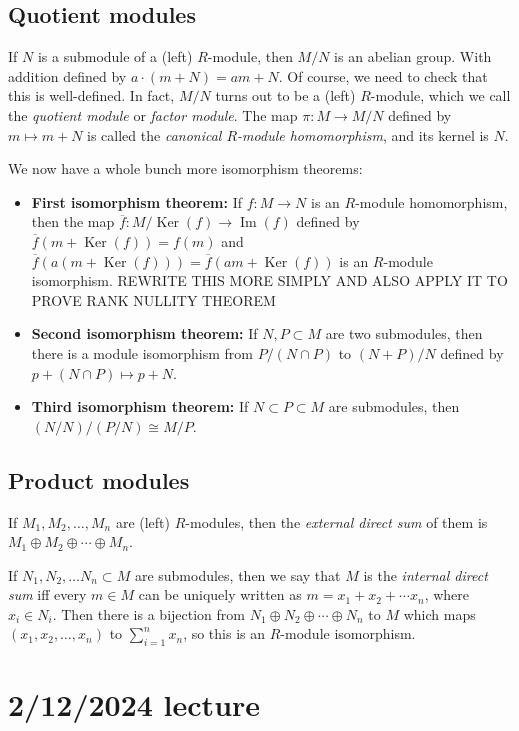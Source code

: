 \documentclass[12pt]{article}
\begin{document}
\subsection{Quotient modules}
If $N$ is a submodule of a (left) $R$-module, then $M/N$ is an abelian group. With addition defined by $a \cdot (m+N)=am+N$. Of course, we need to check that this is well-defined. In fact, $M/N$ turns out to be a (left) $R$-module, which we call the \textit{quotient module} or \textit{factor module}. The map $\pi: M\rightarrow M/N$ defined by $m \mapsto m+N$ is called the \textit{canonical $R$-module homomorphism}, and its kernel is $N$.
\par
We now have a whole bunch more isomorphism theorems:
\begin{itemize}
    \item \textbf{First isomorphism theorem:} If $f: M \rightarrow N$ is an $R$-module homomorphism, then the map $\overline{f}: M/\operatorname{Ker}(f)\rightarrow \operatorname{Im}(f)$ defined by $\overline{f}(m+\operatorname{Ker}(f)) = f(m)$ and $\overline{f}(a(m+\operatorname{Ker}(f))) = \overline{f}(am+\operatorname{Ker}(f))$ is an $R$-module isomorphism. REWRITE THIS MORE SIMPLY AND ALSO APPLY IT TO PROVE RANK NULLITY THEOREM
    \item \textbf{Second isomorphism theorem:} If $N,P \subset M$ are two submodules, then there is a module isomorphism from $P/(N \cap P)$ to $(N+P)/N$ defined by $p+(N \cap P) \mapsto p+N$.
    \item \textbf{Third isomorphism theorem:} If $N \subset P \subset M$ are submodules, then $(N/N)/(P/N) \cong M/P$.
\end{itemize}
\subsection{Product modules}
If $M_1, M_2, \dots, M_n$ are (left) $R$-modules, then the \textit{external direct sum} of them is $M_1 \oplus M_2 \oplus \cdots \oplus M_n$.
\par
If $N_1, N_2, \dots N_n \subset M$ are submodules, then we say that $M$ is the \textit{internal direct sum} iff every $m \in M$ can be uniquely written as $m=x_1 + x_2 + \cdots x_n$, where $x_i \in N_i$. Then there is a bijection from $N_1 \oplus N_2 \oplus \cdots \oplus N_n$ to $M$ which maps $(x_1, x_2, \dots, x_n)$ to $\sum_{i=1}^n x_n$, so this is an $R$-module isomorphism.

\section{2/12/2024 lecture}
\end{document}
